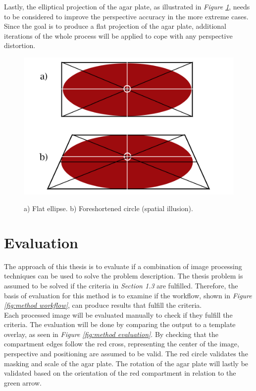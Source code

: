 \noindent Lastly, the elliptical projection of the agar plate, as illustrated in \textit{Figure \ref{fig:method projection}}, needs to be considered to improve the perspective accuracy in the more extreme cases. Since the goal is to produce a flat projection of the agar plate, additional iterations of the whole process will be applied to cope with any perspective distortion.

\begin{figure}[H]
    \centering
    \includegraphics[width=0.5\linewidth]{figures/PDF/Ellipse_projection.pdf}\\
    \caption{a) Flat ellipse. b) Foreshortened circle (spatial illusion).}
    \label{fig:method projection}
\end{figure}



\section{Evaluation}
The approach of this thesis is to evaluate if a combination of image processing techniques can be used to solve the problem description. The thesis problem is assumed to be solved if the criteria in \textit{Section 1.3} are fulfilled. Therefore, the basis of evaluation for this method is to examine if the workflow, shown in \textit{Figure \ref{fig:method workflow}}, can produce results that fulfill the criteria. \\

\noindent Each processed image will be evaluated manually to check if they fulfill the criteria. The evaluation will be done by comparing the output to a template overlay, as seen in \textit{Figure \ref{fig:method evaluation}}. By checking that the compartment edges follow the red cross, representing the center of the image, perspective and positioning are assumed to be valid. The red circle validates the masking and scale of the agar plate. The rotation of the agar plate will lastly be validated based on the orientation of the red compartment in relation to the green arrow. 

